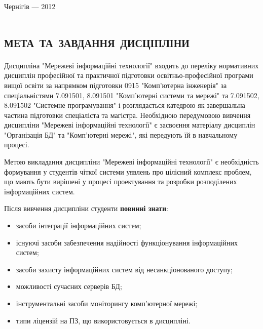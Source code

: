\documentclass[a4paper,14pt,ukrainian]{extarticle}
\begin{document}
\begin{titlepage}
\vspace{\fill}

\begin{center}
Чернігів --- 2012
\end{center}

\end{titlepage}



\newcommand{\ssection}[1]{%
  {\normalsize \newpage\section[#1]{\centering\textbf{\scshape #1}}}}
\newcommand{\ssubsection}[1]{%
  \subsection[#1]{\centering\textbf{#1}}}



  
\ssection{мета та завдання дисціпліни}

Дисципліна  "Мережеві інформаційні технології" входить до переліку нормативних дисциплін професійної та практичної підготовки освітньо-професійної програми вищої освіти за  напрямком підготовки 0915 "Комп'ютерна інженерія" за  спеціальністями 7.091501, 8.091501 "Комп'ютерні системи та мережі" та 7.091502, 8.091502 "Системне програмування" і розглядається катедрою як завершальна частина підготовки спеціаліста та магістра. Необхідною передумовою вивчення дисципліни "Мережеві інформаційні технології" є засвоєння матеріалу дисциплін "Організація БД" та "Комп'ютерні мережі", які передують їй в навчальному процесі.

Метою викладання дисципліни "Мережеві інформаційні технології" є необхідність формування у студентів чіткої системи уявлень про цілісний комплекс проблем, що мають бути вирішені  у процесі проектування та розробки розподілених  інформаційних систем.

Після вивчення дисципліни студенти \textbf{повинні знати}:
\begin{itemize}
\setlength{\parskip}{0pt}
\setlength{\parsep}{0pt}
\setlength{\itemsep}{1pt}
\item засоби інтеграції інформаційних систем;
\item існуючі засоби забезпечення надійності функціонування інформаційних систем;
\item засоби захисту інформаційних систем від несанкціонованого доступу;
\item можливості сучасних серверів БД;
\item інструментальні засоби моніторингу комп'ютерної мережі;
\item типи ліцензій на ПЗ, що використовується в дисципліні.
\end{itemize}
\end{document}
